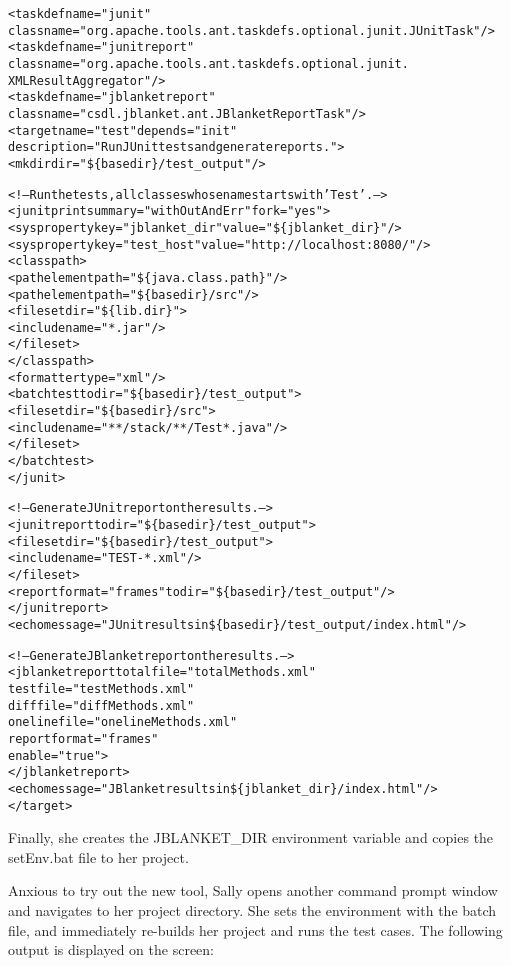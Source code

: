 \begin{alltt}
{\small{}<taskdef name="junit"
 classname="org.apache.tools.ant.taskdefs.optional.junit.JUnitTask" />
  <taskdef name="junitreport" 
   classname="org.apache.tools.ant.taskdefs.optional.junit.
              XMLResultAggregator" />
  <taskdef name="jblanketreport"
   classname="csdl.jblanket.ant.JBlanketReportTask"/>
  <target name="test" depends="init"
    description="Run JUnit tests and generate reports.">
    <mkdir dir="\$\{basedir\}/test_output"/>

    <!-- Run the tests, all classes whose name starts with 'Test'. -->
    <junit printsummary="withOutAndErr" fork="yes">
      <sysproperty key="jblanket_dir" value="\$\{jblanket_dir\}"/>
      <sysproperty key="test_host" value="http://localhost:8080/"/>
      <classpath>
        <pathelement path="\$\{java.class.path\}"/>
        <pathelement path="\$\{basedir\}/src"/>
        <fileset dir="\$\{lib.dir\}">
          <include name="*.jar"/>
        </fileset>
      </classpath>
      <formatter type="xml" />
      <batchtest todir="\$\{basedir\}/test_output">
        <fileset dir="\$\{basedir\}/src">
          <include name="**/stack/**/Test*.java" />
        </fileset>
      </batchtest>
    </junit>

    <!-- Generate JUnit report on the results. -->
    <junitreport todir="\$\{basedir\}/test_output">
      <fileset dir="\$\{basedir\}/test_output">
        <include name="TEST-*.xml"/>
      </fileset>
      <report format="frames" todir="\$\{basedir\}/test_output" />
    </junitreport>
    <echo message="JUnit results in \$\{basedir\}/test_output/index.html" />

    <!-- Generate JBlanket report on the results. -->
    <jblanketreport totalfile="totalMethods.xml"
                    testfile="testMethods.xml"
                    difffile="diffMethods.xml"
                    onelinefile="onelineMethods.xml"
                    reportformat="frames"
                    enable="true">
    </jblanketreport>
    <echo message="JBlanket results in \$\{jblanket_dir\}/index.html" />
  </target>
}
\end{alltt}
Finally, she creates the JBLANKET\_DIR environment variable and copies the
setEnv.bat file to her project.

Anxious to try out the new tool, Sally opens another command prompt window
and navigates to her project directory.  She sets the environment with the
batch file, and immediately re-builds her project and runs the test cases.
The following output is displayed on the screen:

